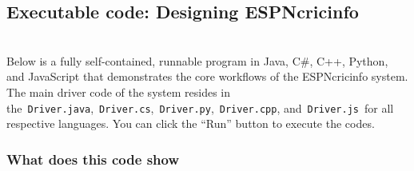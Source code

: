 \subsection{Executable code: Designing ESPNcricinfo}\label{XcqXZGoAsscstZRETmH8h}
\\
Below is a fully self-contained, runnable program in Java, C\#, C++, Python, and JavaScript that demonstrates the core workflows of the ESPNcricinfo system. The main driver code of the system resides in the~\texttt{Driver.java},~\texttt{Driver.cs},~\texttt{Driver.py},~\texttt{Driver.cpp}, and~\texttt{Driver.js}~for all respective languages. You can click the ``Run'' button to execute the codes.

\subsubsection{What does this code show}\label{-0lvMPhQYkMcoeDw4Hs-0}

